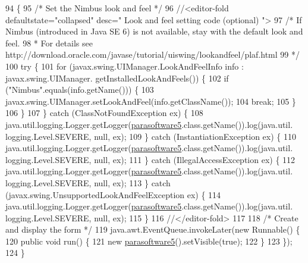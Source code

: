 \begin{DoxyCode}
94                                            \{
95         \textcolor{comment}{/* Set the Nimbus look and feel */}
96         \textcolor{comment}{//<editor-fold defaultstate="collapsed" desc=" Look and feel setting code (optional) ">}
97         \textcolor{comment}{/* If Nimbus (introduced in Java SE 6) is not available, stay with the default look and feel.}
98 \textcolor{comment}{         * For details see http://download.oracle.com/javase/tutorial/uiswing/lookandfeel/plaf.html }
99 \textcolor{comment}{         */}
100         \textcolor{keywordflow}{try} \{
101             \textcolor{keywordflow}{for} (javax.swing.UIManager.LookAndFeelInfo info : javax.swing.UIManager.
      getInstalledLookAndFeels()) \{
102                 \textcolor{keywordflow}{if} (\textcolor{stringliteral}{"Nimbus"}.equals(info.getName())) \{
103                     javax.swing.UIManager.setLookAndFeel(info.getClassName());
104                     \textcolor{keywordflow}{break};
105                 \}
106             \}
107         \} \textcolor{keywordflow}{catch} (ClassNotFoundException ex) \{
108             java.util.logging.Logger.getLogger(\mbox{\hyperlink{classsoftware_1_1parasoftware5_ad0430c2ad5591b3b6e6c095661c4e1e9}{parasoftware5}}.class.getName()).log(java.util.
      logging.Level.SEVERE, null, ex);
109         \} \textcolor{keywordflow}{catch} (InstantiationException ex) \{
110             java.util.logging.Logger.getLogger(\mbox{\hyperlink{classsoftware_1_1parasoftware5_ad0430c2ad5591b3b6e6c095661c4e1e9}{parasoftware5}}.class.getName()).log(java.util.
      logging.Level.SEVERE, null, ex);
111         \} \textcolor{keywordflow}{catch} (IllegalAccessException ex) \{
112             java.util.logging.Logger.getLogger(\mbox{\hyperlink{classsoftware_1_1parasoftware5_ad0430c2ad5591b3b6e6c095661c4e1e9}{parasoftware5}}.class.getName()).log(java.util.
      logging.Level.SEVERE, null, ex);
113         \} \textcolor{keywordflow}{catch} (javax.swing.UnsupportedLookAndFeelException ex) \{
114             java.util.logging.Logger.getLogger(\mbox{\hyperlink{classsoftware_1_1parasoftware5_ad0430c2ad5591b3b6e6c095661c4e1e9}{parasoftware5}}.class.getName()).log(java.util.
      logging.Level.SEVERE, null, ex);
115         \}
116         \textcolor{comment}{//</editor-fold>}
117 
118         \textcolor{comment}{/* Create and display the form */}
119         java.awt.EventQueue.invokeLater(\textcolor{keyword}{new} Runnable() \{
120             \textcolor{keyword}{public} \textcolor{keywordtype}{void} run() \{
121                 \textcolor{keyword}{new} \mbox{\hyperlink{classsoftware_1_1parasoftware5_ad0430c2ad5591b3b6e6c095661c4e1e9}{parasoftware5}}().setVisible(\textcolor{keyword}{true});
122             \}
123         \});
124     \}
\end{DoxyCode}


